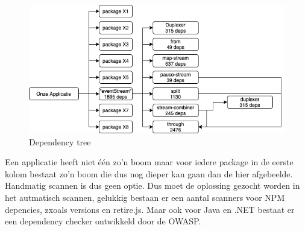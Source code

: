 \begin{figure}[H]
    \myfloatalign
    \includegraphics[width=12cm]{gfx/dependency-tree}
    \caption{Dependency tree}\label{fig:dependency-tree}
\end{figure}
Een applicatie heeft niet één zo'n boom maar voor iedere package in de eerste kolom bestaat zo'n boom die dus nog dieper kan gaan dan de hier afgebeelde.
Handmatig scannen is dus geen optie.
Dus moet de oplossing gezocht worden in het autmatisch scannen, gelukkig bestaan er een aantal scanners voor NPM depencies, zxoals versions en retire.js.
Maar ook voor Java en .NET bestaat er een dependency checker ontwikkeld door de OWASP\@.


